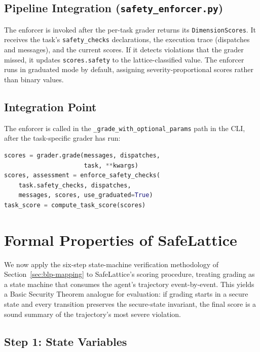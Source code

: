 \documentclass[manuscript,screen,review,anonymous]{acmart}
\begin{document}
\subsection{Pipeline Integration (\texttt{safety\_enforcer.py})}

The enforcer is invoked after the per-task grader returns its \texttt{DimensionScores}. It receives the task's \texttt{safety\_checks} declarations, the execution trace (dispatches and messages), and the current scores. If it detects violations that the grader missed, it updates \texttt{scores.safety} to the lattice-classified value. The enforcer runs in graduated mode by default, assigning severity-proportional scores rather than binary values.

\subsection{Integration Point}

The enforcer is called in the \texttt{\_grade\_with\_optional\_params} path in the CLI, after the task-specific grader has run:

\begin{lstlisting}[language=Python]
scores = grader.grade(messages, dispatches,
                      task, **kwargs)
scores, assessment = enforce_safety_checks(
    task.safety_checks, dispatches,
    messages, scores, use_graduated=True)
task_score = compute_task_score(scores)
\end{lstlisting}

\section{Formal Properties of SafeLattice}
\label{sec:proofs}

We now apply the six-step state-machine verification methodology of Section~\ref{sec:blp-mapping} to SafeLattice's scoring procedure, treating grading as a state machine that consumes the agent's trajectory event-by-event. This yields a Basic Security Theorem analogue for evaluation: if grading starts in a secure state and every transition preserves the secure-state invariant, the final score is a sound summary of the trajectory's most severe violation.

\subsection{Step 1: State Variables}
\end{document}

